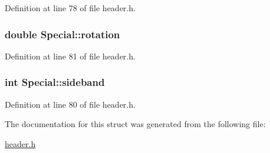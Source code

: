 Definition at line 78 of file header.h.\hypertarget{structSpecial_a56799b3053803e5e2634306472390666}{
\subsubsection[{rotation}]{\setlength{\rightskip}{0pt plus 5cm}double {\bf Special::rotation}}}
\label{structSpecial_a56799b3053803e5e2634306472390666}


Definition at line 81 of file header.h.\hypertarget{structSpecial_ae089f87340180c38a7bd54062505b909}{
\subsubsection[{sideband}]{\setlength{\rightskip}{0pt plus 5cm}int {\bf Special::sideband}}}
\label{structSpecial_ae089f87340180c38a7bd54062505b909}


Definition at line 80 of file header.h.

The documentation for this struct was generated from the following file:\begin{DoxyCompactItemize}
\item 
\hyperlink{header_8h}{header.h}\end{DoxyCompactItemize}
